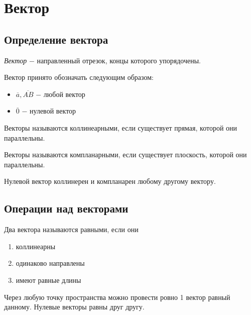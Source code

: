 \section{Вектор}

\subsection{Определение вектора}

\begin{definition}
	\textit{Вектор} $-$ направленный отрезок, концы которого упорядочены.
\end{definition}

Вектор принято обозначать следующим образом:

\begin{itemize}
	\item $\overline{a}, \overline{AB}$ $-$ любой вектор
	\item $\overline{0}$ $-$ нулевой вектор
\end{itemize}

\begin{definition}
	Векторы называются $\textit{коллинеарными}$, если существует прямая, которой они параллельны.
\end{definition}

\begin{definition}
	Векторы называются $\textit{компланарными}$, если существует плоскость, которой они параллельны.
\end{definition}

Нулевой вектор коллинерен и компланарен любому другому вектору.

\subsection{Операции над векторами}

\begin{definition}
	Два вектора называются $\textit{равными}$, если они
	\begin{enumerate}
		\item коллинеарны
		\item одинаково направлены
		\item имеют равные длины
	\end{enumerate}
\end{definition}

Через любую точку пространства можно провести ровно 1 вектор равный данному. Нулевые векторы равны друг другу.

